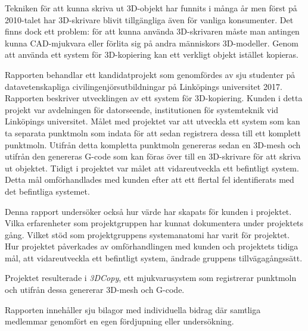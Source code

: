 Tekniken för att kunna skriva ut 3D-objekt har funnits i många år men först på 2010-talet har 3D-skrivare blivit tillgängliga även för vanliga konsumenter. Det finns dock ett problem: för att kunna använda 3D-skrivaren måste man antingen kunna CAD-mjukvara eller förlita sig på andra människors 3D-modeller. Genom att använda ett system för 3D-kopiering kan ett verkligt objekt istället kopieras.

Rapporten behandlar ett kandidatprojekt som genomfördes av sju studenter på datavetenskapliga civilingenjörsutbildningar på Linköpings universitet 2017. Rapporten beskriver utvecklingen av ett system för 3D-kopiering. Kunden i detta projekt var avdelningen för datorseende, institutionen för systemteknik vid Linköpings universitet. Målet med projektet var att utveckla ett system som kan ta separata punktmoln som indata för att sedan registrera dessa till ett komplett punktmoln. Utifrån detta kompletta punktmoln genereras sedan en 3D-mesh och utifrån den genereras G-code som kan föras över till en 3D-skrivare för att skriva ut objektet.
Tidigt i projektet var målet att vidareutveckla ett befintligt system. Detta mål omförhandlades med kunden efter att ett flertal fel identifierats med det befintliga systemet. 

Denna rapport undersöker också hur värde har skapats för kunden i projektet. Vilka erfarenheter som projektgruppen har kunnat dokumentera under projektets gång. Vilket stöd som projektgruppens systemanatomi har varit för projektet. Hur projektet påverkades av omförhandlingen med kunden och projektets tidiga mål, att vidareutveckla ett befintligt system, ändrade gruppens tillvägagångssätt.

Projektet resulterade i \textit{3DCopy}, ett mjukvarusystem som registrerar punktmoln och utifrån dessa genererar 3D-mesh och G-code.

Rapporten innehåller sju bilagor med individuella bidrag där samtliga medlemmar genomfört en egen fördjupning eller undersökning. 

